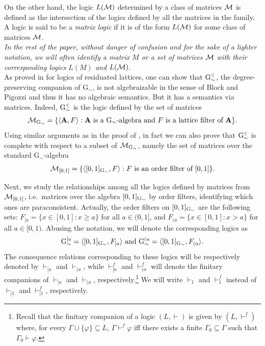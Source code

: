 \documentclass{article}
\theoremstyle{definition}
\newcommand{\Gsimleq}{\mathrm{G}\mystrut^{\text{\tiny $\leq$}}_{\sim}}
\newcommand\mystrut{\rule{0pt}{7pt}}
\begin{document}
\noindent On the other hand, the logic $L({\cal M})$ determined by a class of matrices $\cal M$ is defined as the intersection of the logics defined by all the matrices in the family. A logic is said to be a {\em matrix logic} if it is of the form $L({\cal M})$ for some class of matrices $\cal M$.\\

 {\em In the rest of the paper, without danger of confusion and for the sake of a lighter notation, we will often  identify a matrix $M$ or a set of matrices $\cal M$ with their corresponding logics $L(M)$ and $L({\cal M})$}.   \\



As proved in \cite{BEFGGTV} for logics of residuated lattices, one can show that $\Gsimleq$,  the degree-preserving companion of G$_\sim$,  is not algebraizable in the sense of Block and Pigozzi and thus it has no algebraic semantics. But it has a semantics via matrices. Indeed,
$\Gsimleq$ is the logic defined by the set of matrices $${\cal M}_{{\rm G}_\sim} = \{\langle {\bf A}, F\rangle : {\bf A} \mbox{ is a } {\rm G}_{\sim}\mbox{-algebra and } F \mbox{ is a lattice filter of } {\bf A}\}.$$
Using similar arguments as in the proof of \cite[Theorem 2.12]{BEFGGTV}, in fact we can also prove that $\Gsimleq$ is complete
with respect to a subset of ${\cal M}_{{\rm G}_\sim}$, namely the set of matrices over the standard G$_\sim$-algebra
$${\cal M}_{[0, 1]} = \{\langle [0,1]_{{\rm G}_\sim}, F\rangle :  F \mbox{ is an order filter of } [0,1]\}.$$


Next, we study the relationships among all the logics defined by matrices from ${\cal M}_{[0, 1]}$, i.e.\ matrices over the algebra $[0,1]_{\rm{G}_\sim}$ by order filters, identifying which ones are paraconsistent.
%
Actually, the order filters on $[0,1]_{\rm{G}_\sim}$ are the following sets: $F_{[a} = \{x\in [0,1] : x\geq a\}$ for all $a \in (0, 1]$, and $F_{(a} = \{x\in [0,1] : x > a\}$ for all $a \in [0, 1)$. Abusing the notation, we will denote the corresponding logics as
$${\rm G}^{[a}_\sim = \langle [0,1]_{\rm{G}_\sim}, F_{[a}\rangle \mbox{ and } {\rm G}^{(a}_\sim=\langle [0,1]_{\rm{G}_\sim}, F_{(a} \rangle .$$
The consequence relations corresponding to these logics will be respectively denoted by $\vdash_{[a}$ and $\vdash_{(a}$, while $\vdash^f_{[a}$  and $\vdash^f_{(a}$ will denote the finitary companions of $\vdash_{[a}$ and $\vdash_{(a}$, respectively.\footnote{Recall that the finitary companion of a logic $(L, \vdash)$ is given by $(L, \vdash^f)$ where, for every $\Gamma \cup \{\varphi\} \subseteq L$, $\Gamma \vdash^f \varphi$ iff there exists a finite $\Gamma_0 \subseteq \Gamma$ such that  $\Gamma_0 \vdash \varphi$.}
We will write $\vdash_{1}$ and $\vdash^f_{1}$ instead of $\vdash_{[1}$ and $\vdash^f_{[1}$, respectively. 
\end{document}
